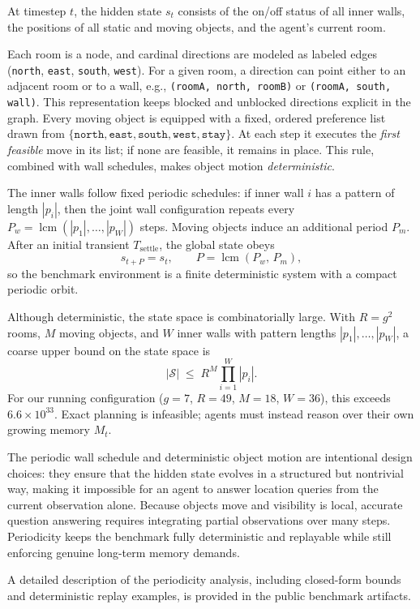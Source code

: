 \documentclass[Afour,sageh,times]{sagej}
\begin{document}
At timestep $t$, the hidden state $s_t$ consists of the on/off status of all inner
walls, the positions of all static and moving objects, and the agent's current room.

Each room is a node, and cardinal directions are modeled as labeled edges
(\texttt{north}, \texttt{east}, \texttt{south}, \texttt{west}). For a given room, a
direction can point either to an adjacent room or to a wall, e.g.,
\texttt{(roomA, north, roomB)} or \texttt{(roomA, south, wall)}. This representation
keeps blocked and unblocked directions explicit in the graph.
Every moving object is equipped with a fixed, ordered preference list drawn from
$\{\texttt{north},\texttt{east},\texttt{south},\texttt{west},\texttt{stay}\}$. At each
step it executes the \emph{first feasible} move in its list; if none are feasible, it
remains in place. This rule, combined with wall schedules, makes object motion
\emph{deterministic}.

The inner walls follow fixed periodic schedules: if inner wall $i$ has a pattern of
length $|p_i|$, then the joint wall configuration repeats every $P_w =
\operatorname{lcm}(|p_1|,\dots,|p_W|)$ steps. Moving objects induce an additional period
$P_m$. After an initial transient $T_{\text{settle}}$, the global state obeys
\[
  s_{t+P} = s_t, \qquad P = \operatorname{lcm}(P_w,\, P_m),
\]
so the benchmark environment is a finite deterministic system with a compact periodic
orbit.

Although deterministic, the state space is combinatorially large. With $R = g^2$ rooms,
$M$ moving objects, and $W$ inner walls with pattern lengths $|p_1|,\dots,|p_W|$, a
coarse upper bound on the state space is
\[
  |\mathcal{S}| \;\le\; R^M \prod_{i=1}^{W} |p_i|.
\]
For our running configuration ($g{=}7$, $R{=}49$, $M{=}18$, $W{=}36$), this exceeds
$6.6\times 10^{33}$. Exact planning is infeasible; agents must instead reason over their
own growing memory $M_t$.

The periodic wall schedule and deterministic object motion are intentional design
choices: they ensure that the hidden state evolves in a structured but nontrivial way,
making it impossible for an agent to answer location queries from the current
observation alone. Because objects move and visibility is local, accurate question
answering requires integrating partial observations over many steps. Periodicity keeps
the benchmark fully deterministic and replayable while still enforcing genuine
long-term memory demands.

A detailed description of the periodicity analysis, including closed-form bounds and
deterministic replay examples, is provided in the public benchmark artifacts.
\end{document}
